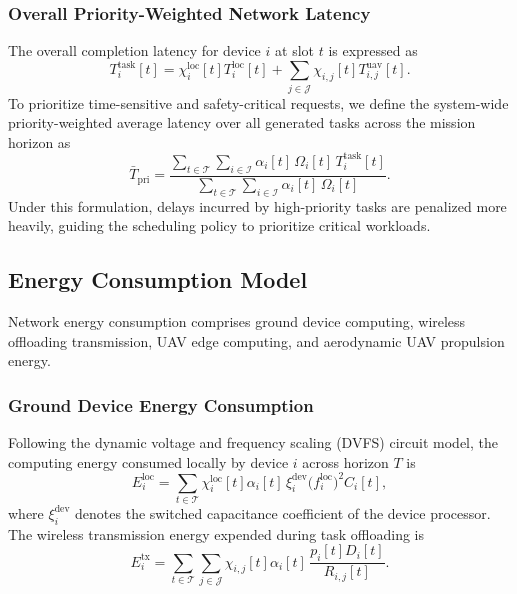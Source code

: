 \documentclass[journal]{IEEEtran}
\begin{document}
\subsubsection{Overall Priority-Weighted Network Latency}
The overall completion latency for device $i$ at slot $t$ is expressed as
\begin{equation}
    T_i^{\mathrm{task}}[t] = \chi_i^{\mathrm{loc}}[t] T_i^{\mathrm{loc}}[t] + \sum_{j \in \mathcal{J}} \chi_{i,j}[t] T_{i,j}^{\mathrm{uav}}[t].
    \label{eq:total_delay}
\end{equation}
To prioritize time-sensitive and safety-critical requests, we define the system-wide priority-weighted average latency over all generated tasks across the mission horizon as
\begin{equation}
    \bar{T}_{\mathrm{pri}} = \frac{\sum_{t \in \mathcal{T}} \sum_{i \in \mathcal{I}} \alpha_i[t]\, \Omega_i[t]\, T_i^{\mathrm{task}}[t]}{\sum_{t \in \mathcal{T}} \sum_{i \in \mathcal{I}} \alpha_i[t]\, \Omega_i[t]}.
    \label{eq:avg_delay_priority}
\end{equation}
Under this formulation, delays incurred by high-priority tasks are penalized more heavily, guiding the scheduling policy to prioritize critical workloads.

\subsection{Energy Consumption Model}
\label{sec:energy_model}

Network energy consumption comprises ground device computing, wireless offloading transmission, UAV edge computing, and aerodynamic UAV propulsion energy.

\subsubsection{Ground Device Energy Consumption}
Following the dynamic voltage and frequency scaling (DVFS) circuit model, the computing energy consumed locally by device $i$ across horizon $T$ is
\begin{equation}
    E_i^{\mathrm{loc}} = \sum_{t \in \mathcal{T}} \chi_i^{\mathrm{loc}}[t] \alpha_i[t] \, \xi_i^{\mathrm{dev}} \bigl(f_i^{\mathrm{loc}}\bigr)^2 C_i[t],
    \label{eq:wd_loc_energy_total}
\end{equation}
where $\xi_i^{\mathrm{dev}}$ denotes the switched capacitance coefficient of the device processor. The wireless transmission energy expended during task offloading is
\begin{equation}
    E_i^{\mathrm{tx}} = \sum_{t \in \mathcal{T}} \sum_{j \in \mathcal{J}} \chi_{i,j}[t] \alpha_i[t] \, \frac{p_i[t] D_i[t]}{R_{i,j}[t]}.
    \label{eq:wd_tx_energy_total}
\end{equation}
\end{document}
